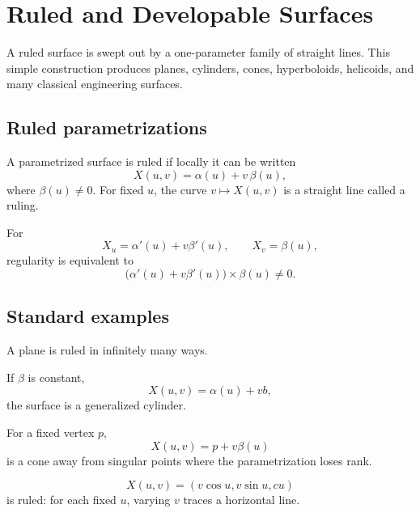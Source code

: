 \chapter{Ruled and Developable Surfaces}
\label{ch:vii18-ruled-developable-surfaces}

A ruled surface is swept out by a one-parameter family of straight lines.  This simple construction produces planes, cylinders, cones, hyperboloids, helicoids, and many classical engineering surfaces.

\section{Ruled parametrizations}

\begin{definition}\label{def:vii18-ruled}
A parametrized surface is ruled if locally it can be written
\[
X(u,v)=\alpha(u)+v\,\beta(u),
\]
where \(\beta(u)\neq0\). For fixed \(u\), the curve \(v\mapsto X(u,v)\) is a straight line called a ruling.
\end{definition}

\begin{proposition}\label{prop:vii18-regularity}
For
\[
X_u=\alpha'(u)+v\beta'(u),\qquad X_v=\beta(u),
\]
regularity is equivalent to
\[
\bigl(\alpha'(u)+v\beta'(u)\bigr)\times\beta(u)\neq0.
\]
\end{proposition}

\section{Standard examples}

\begin{example}[Plane]\label{ex:vii18-plane}
A plane is ruled in infinitely many ways.
\end{example}

\begin{example}\label{ex:vii18-cylinder}
If \(\beta\) is constant,
\[
X(u,v)=\alpha(u)+v b,
\]
the surface is a generalized cylinder.
\end{example}

\begin{example}[Cone]\label{ex:vii18-cone}
For a fixed vertex \(p\),
\[
X(u,v)=p+v\beta(u)
\]
is a cone away from singular points where the parametrization loses rank.
\end{example}

\begin{example}[Helicoid]\label{ex:vii18-helicoid}
\[
X(u,v)=(v\cos u,v\sin u,cu)
\]
is ruled: for each fixed \(u\), varying \(v\) traces a horizontal line.
\end{example}

